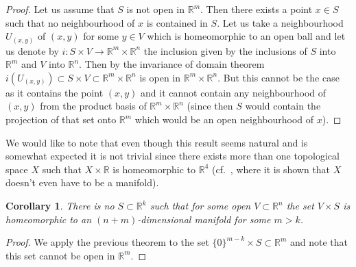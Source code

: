\documentclass[pdftex]{sigma}
\newtheorem{cor}[tw]{Corollary}
\begin{document}
\begin{proof} Let us assume that $S$ is not open in $\mathbb{R}^m$. Then there exists a point $x\in S$ such that no neighbourhood of $x$ is contained in $S$. Let us take a neighbourhood $U_{(x,y)}$ of $(x,y)$ for some $y\in V$ which is homeomorphic to an open ball and let us denote by $i\colon S\times V\rightarrow \mathbb{R}^m\times\mathbb{R}^n$ the inclusion given by the inclusions of $S$ into $\mathbb{R}^m$ and $V$ into $\mathbb{R}^n$. Then by the invariance of domain theorem $i(U_{(x,y)})\subset S\times V\subset \mathbb{R}^m\times\mathbb{R}^n$ is open in $\mathbb{R}^m\times\mathbb{R}^n$. But this cannot be the case as it contains the point $(x,y)$ and it cannot contain any neighbourhood of $(x,y)$ from the product basis of $\mathbb{R}^m\times\mathbb{R}^n$ (since then $S$ would contain the projection of that set onto $\mathbb{R}^m$ which would be an open neighbourhood of $x$).
\end{proof}

\begin{rem} We would like to note that even though this result seems natural and is somewhat expected it is not trivial since there exists more than one topological space $X$ such that $X\times\mathbb{R}$ is homeomorphic to $\mathbb{R}^4$ (cf.~\cite{B}, where it is shown that $X$ doesn't even have to be a manifold).
\end{rem}
\begin{cor}\label{prod2} There is no $S\subset\mathbb{R}^k$ such that for some open $V\subset\mathbb{R}^n$ the set $V\times S$ is homeomorphic to an $(n+m)$-dimensional manifold for some $m>k$.\end{cor}

\begin{proof} We apply the previous theorem to the set $\{0\}^{m-k}\times S\subset\mathbb{R}^m$ and note that this set cannot be open in $\mathbb{R}^m$.
\end{proof}
\end{document}
